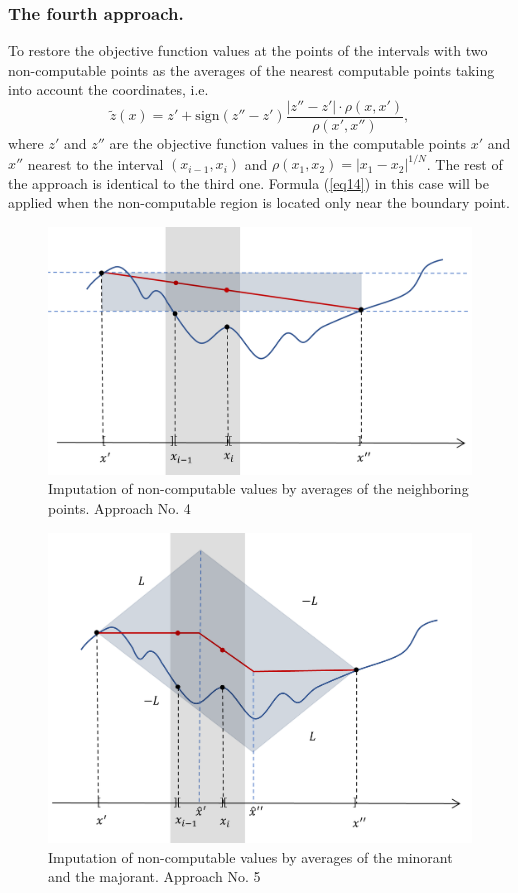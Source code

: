 \documentclass[runningheads]{llncs}
\begin{document}
\subsubsection{The fourth approach.} To restore the objective function values at the points of the intervals with two non-computable points as the averages of the nearest computable points taking into account the coordinates, i.e.
\begin{equation}\label{eq17} 
\tilde{z}(x)=z'+ \text{sign}(z''-z') \frac {|z''-z'| \cdot \rho(x,x')}{\rho(x',x'') },
\end{equation}
where $z'$ and $z''$ are the objective function values in the computable points $x'$ and $x''$  nearest to the interval $(x_{i-1},x_i)$ and $\rho(x_1,x_2) =  |x_1 - x_2|^{1/N}$.
The rest of the approach is identical to the third one. Formula (\ref{eq14}) in this case will be applied when the non-computable region is located only near the boundary point.
\begin{figure}
\includegraphics[width=\textwidth]{fig4.png}
\caption{Imputation of non-computable values by averages of the neighboring points. Approach No. 4} \label{fig4}
\end{figure}
\begin{figure}
\includegraphics[width=\textwidth]{fig5.png}
\caption{Imputation of non-computable values by averages of the minorant and the majorant. Approach No. 5} \label{fig5}
\end{figure}
\end{document}
